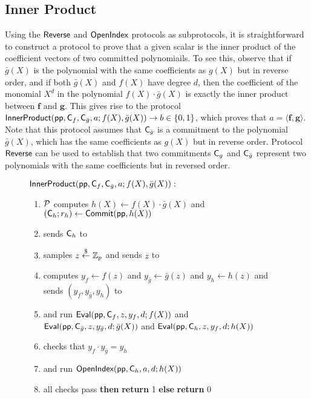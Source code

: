 \subsection{Inner Product}

Using the $\textsf{{Reverse}}$ and $\textsf{{OpenIndex}}$ protocols as subprotocols, it is straightforward to construct a protocol to prove that a given scalar is the inner product of the coefficient vectors of two committed polynomiails. To see this, observe that if $\bar{g}(X)$ is the polynomial with the same coefficients as $g(X)$ but in reverse order, and if both $\bar{g}(X)$ and $f(X)$ have degree $d$, then the coefficient of the monomial $X^d$ in the polynomial $f(X) \cdot \bar{g}(X)$ is exactly the inner product between $\mathbf{f}$ and $\mathbf{g}$. This gives rise to the protocol $\textsf{{InnerProduct}}(\textsf{pp}, \mathsf{C}_{f}, \mathsf{C}_{\bar{g}}, a; {f}(X), {\bar{g}}(X)) \rightarrow b \in \{0,1\}$, which proves that $a = \langle \mathbf{f}, \mathbf{g} \rangle$. Note that this protocol assumes that $\mathsf{C}_{\bar{g}}$ is a commitment to the polynomial $\bar{g}(X)$, which has the same coefficients as $g(X)$ but in reverse order. Protocol $\textsf{{Reverse}}$ can be used to establish that two commitments $\mathsf{C}_g$ and $\mathsf{C}_{\bar{g}}$ represent two polynomials with the same coefficients but in reversed order.

\begin{figure}[!htp]
\noindent\begin{mdframed}[userdefinedwidth=\textwidth]
\begin{minipage}{\textwidth}
	\begin{flushleft}
	$\textsf{{InnerProduct}}(\textsf{pp}, \mathsf{C}_{{f}}, \mathsf{C}_{\bar{g}}, a; f(X), \bar{g}(X)):$ 
		\begin{enumerate}[nolistsep]
		    \item $\mathcal{P}$ computes $h(X) \gets f(X) \cdot \bar{g}(X)$ and $(\mathsf{C}_h; r_h) \gets \textsf{{Commit}}(\textsf{pp}, h(X))$
		    \item \prover sends $\mathsf{C}_h$ to \verifier
		    \item \verifier samples $z \overset{\$}{\gets} \mathbb{Z}_p$ and sends $z$ to \prover
		    \item \prover computes $y_f \gets f(z)$ and $y_{\bar{g}} \gets \bar{g}(z)$ and $y_h \gets h(z)$ and sends $(y_f, y_{\bar{g}}, y_h)$ to \verifier
		    \item \prover and \verifier run $\textsf{{Eval}}(\textsf{pp}, \mathsf{C}_f, z, y_f, d; f(X))$ and $\textsf{{Eval}}(\textsf{pp}, \mathsf{C}_{\bar{g}}, z, y_{\bar{g}}, d; \bar{g}(X))$ and $\textsf{{Eval}}(\textsf{pp}, \mathsf{C}_h, z, y_f, d; h(X))$
		    \item \verifier checks that $y_f \cdot y_{\bar{g}} = y_h$
		    \item \prover and \verifier run $\textsf{{OpenIndex}}(\textsf{pp}, \mathsf{C}_h, a, d; h(X))$
		    \item \pcif{}all checks pass \textbf{then} \textbf{return} 1 \textbf{else} \textbf{return} 0
		\end{enumerate}
	\end{flushleft}
\end{minipage}
\end{mdframed}
\end{figure}

